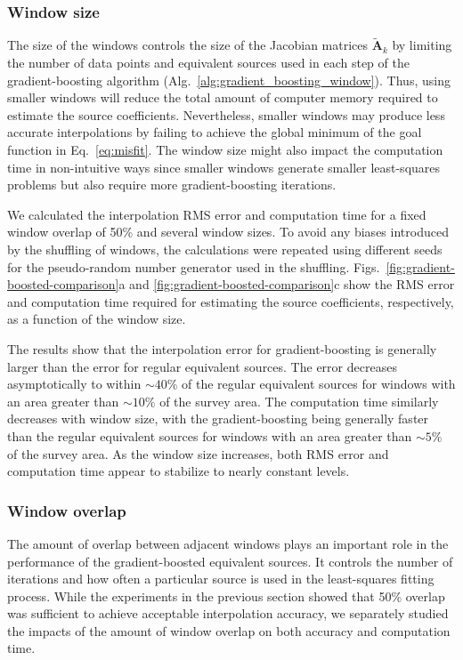 \subsubsection{Window size}
\label{sec:window_size}

The size of the windows controls the size of the Jacobian matrices
$\tilde{\mathbf{A}}_k$ by limiting the number of data points and equivalent
sources used in each step of the gradient-boosting algorithm
(Alg.~\ref{alg:gradient_boosting_window}).
Thus, using smaller windows will reduce the total amount of computer memory
required to estimate the source coefficients.
Nevertheless, smaller windows may produce less accurate interpolations by
failing to achieve the global minimum of the goal function in
Eq.~\ref{eq:misfit}.
The window size might also impact the computation time in non-intuitive ways
since smaller windows generate smaller least-squares problems but also require
more gradient-boosting iterations.

We calculated the interpolation RMS error and computation time for a fixed
window overlap of 50\% and several window sizes.
To avoid any biases introduced by the shuffling of windows, the calculations
were repeated using different seeds for the pseudo-random number generator used
in the shuffling.
Figs.~\ref{fig:gradient-boosted-comparison}a and
\ref{fig:gradient-boosted-comparison}c show the RMS error and computation time
required for estimating the source coefficients, respectively, as a function of
the window size.

The results show that the interpolation error for gradient-boosting is
generally larger than the error for regular equivalent sources.
The error decreases asymptotically to within $\sim 40\%$ of the regular
equivalent sources for windows with an area greater than $\sim 10\%$ of the
survey area.
The computation time similarly decreases with window size, with the
gradient-boosting being generally faster than the regular equivalent sources
for windows with an area greater than $\sim 5\%$ of the survey area.
As the window size increases, both RMS error and computation time appear to
stabilize to nearly constant levels.

\subsubsection{Window overlap}

The amount of overlap between adjacent windows plays an important role in the
performance of the gradient-boosted equivalent sources.
It controls the number of iterations and how often a particular source is used
in the least-squares fitting process.
While the experiments in the previous section showed that 50\% overlap was
sufficient to achieve acceptable interpolation accuracy, we separately studied
the impacts of the amount of window overlap on both accuracy and computation
time.

